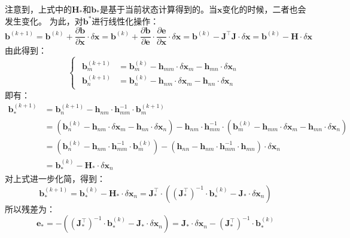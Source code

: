 \documentclass[12pt, onecolumn]{article}
\begin{document}
	注意到，上式中的$\boldsymbol{H}_*$和$\boldsymbol{b}_*$是基于当前状态计算得到的。当$\boldsymbol{x}$变化的时候，二者也会发生变化。
	为此，对$\boldsymbol{b}^*$进行线性化操作：
	\begin{equation}
	\boldsymbol{b}^{(k+1)}=\boldsymbol{b}^{(k)}+\frac{\partial \boldsymbol{b}}{\partial\boldsymbol{x}}\cdot\delta\boldsymbol{x}=
	\boldsymbol{b}^{(k)}+\frac{\partial \boldsymbol{b}}{\partial\boldsymbol{e}}\cdot\frac{\partial \boldsymbol{e}}{\partial\boldsymbol{x}}\cdot\delta\boldsymbol{x}=
	\boldsymbol{b}^{(k)}-\boldsymbol{J}^\top\boldsymbol{J}\cdot\delta\boldsymbol{x}=\boldsymbol{b}^{(k)}-\boldsymbol{H}\cdot\delta\boldsymbol{x}
	\end{equation}
	由此得到：
	\begin{equation}
	\begin{cases}
	\begin{aligned}
	\boldsymbol{b}_m^{(k+1)}&=\boldsymbol{b}_m^{(k)}-\boldsymbol{h}_{mm}\cdot\delta\boldsymbol{x}_m-\boldsymbol{h}_{mn}\cdot\delta\boldsymbol{x}_n
	\\
	\boldsymbol{b}_n^{(k+1)}&=\boldsymbol{b}_n^{(k)}-\boldsymbol{h}_{nm}\cdot\delta\boldsymbol{x}_m-\boldsymbol{h}_{nn}\cdot\delta\boldsymbol{x}_n
	\end{aligned}
	\end{cases}
	\end{equation}
	即有：
	\begin{equation}
	\begin{aligned}
	\boldsymbol{b}^{(k+1)}_*&=\boldsymbol{b}_n^{(k+1)}-\boldsymbol{h}_{nm}\cdot\boldsymbol{h}_{mm}^{-1}\cdot\boldsymbol{b}_{m}^{(k+1)}
	\\
	&=\left( \boldsymbol{b}_n^{(k)}-\boldsymbol{h}_{nm}\cdot\delta\boldsymbol{x}_m-\boldsymbol{h}_{nn}\cdot\delta\boldsymbol{x}_n\right) -\boldsymbol{h}_{nm}\cdot\boldsymbol{h}_{mm}^{-1}\cdot\left(
	\boldsymbol{b}_m^{(k)}-\boldsymbol{h}_{mm}\cdot\delta\boldsymbol{x}_m-\boldsymbol{h}_{mn}\cdot\delta\boldsymbol{x}_n
	\right) 
	\\
	&=\left( \boldsymbol{b}_n^{(k)}-\boldsymbol{h}_{nm}\cdot\boldsymbol{h}_{mm}^{-1}\cdot\boldsymbol{b}_m^{(k)}\right) -\left( \boldsymbol{h}_{nn}-\boldsymbol{h}_{nm}\cdot\boldsymbol{h}_{mm}^{-1}\cdot\boldsymbol{h}_{mn}\right) \cdot\delta\boldsymbol{x}_n
	\\
	&=\boldsymbol{b}_*^{(k)}-\boldsymbol{H}_*\cdot\delta\boldsymbol{x}_n
	\end{aligned}
	\end{equation}
	对上式进一步化简，得到：
	\begin{equation}
	\boldsymbol{b}^{(k+1)}_*=\boldsymbol{b}_*^{(k)}-\boldsymbol{H}_*\cdot\delta\boldsymbol{x}_n=\boldsymbol{J}_*^\top\cdot\left(\left( {\boldsymbol{J}_*^\top}\right) ^{-1}\cdot\boldsymbol{b}_*^{(k)} -\boldsymbol{J}_*\cdot\delta\boldsymbol{x}_n\right) 
	\end{equation}
	所以残差为：
	\begin{equation}
	\boldsymbol{e}_*=-\left( \left( {\boldsymbol{J}_*^\top}\right) ^{-1}\cdot\boldsymbol{b}_*^{(k)} -\boldsymbol{J}_*\cdot\delta\boldsymbol{x}_n\right) =\boldsymbol{J}_*\cdot\delta\boldsymbol{x}_n-\left( {\boldsymbol{J}_*^\top}\right) ^{-1}\cdot\boldsymbol{b}_*^{(k)}
	\end{equation}
	
\end{document}
